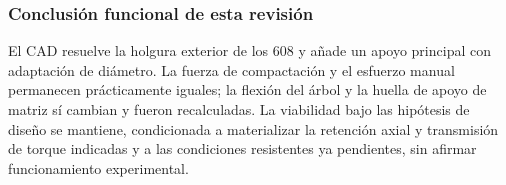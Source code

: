 \subsubsection*{Conclusión funcional de esta revisión}
El CAD resuelve la holgura exterior de los 608 y añade un apoyo principal
con adaptación de diámetro. La fuerza de compactación y el esfuerzo
manual permanecen prácticamente iguales; la flexión del árbol y la huella
de apoyo de matriz sí cambian y fueron recalculadas. La viabilidad bajo
las hipótesis de diseño se mantiene, condicionada a materializar la
retención axial y transmisión de torque indicadas y a las condiciones
resistentes ya pendientes, sin afirmar funcionamiento experimental.
